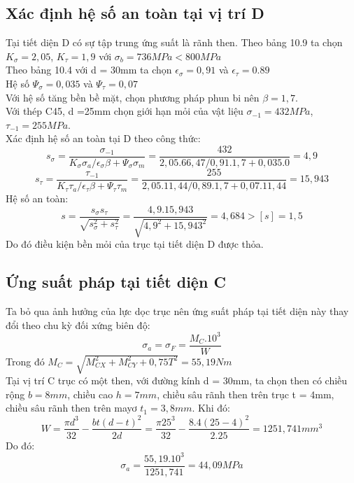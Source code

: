 \subsection{Xác định hệ số an toàn tại vị trí D}
Tại tiết diện D có sự tập trung ứng suất là rãnh then. Theo bảng 10.9 ta chọn $K_\sigma =2,05$, $K_\tau = 1,9$ với $\sigma_b = 736MPa < 800MPa$ \\
Theo bảng 10.4 với d = 30mm ta chọn $\epsilon_\sigma = 0,91$ và $\epsilon_\tau = 0.89$ \\
Hệ số $\Psi_\sigma = 0,035$ và $\Psi_\tau = 0,07$ \\ 
Với hệ số tăng bền bề mặt, chọn phương pháp phun bi nên $\beta = 1,7$. \\
Với thép C45, d =25mm chọn giới hạn mỏi của vật liệu $\sigma_{-1} = 432MPa$, $\tau_{-1} = 255MPa$. \\
Xác định hệ số an toàn tại D theo công thức:
\[
    s_\sigma = \frac{\sigma_{-1}}{K_\sigma \sigma_a / \epsilon_\sigma \beta + \Psi_\sigma \sigma_m} = \frac{432}{2,05.66,47/0,91.1,7 + 0,035.0} = 4,9
\]
\[
    s_\tau = \frac{\tau_{-1}}{K_\tau \tau_a / \epsilon_\tau \beta + \Psi_\tau \tau_m} = \frac{255}{2,05.11,44/0,89.1,7 + 0,07.11,44} = 15,943
\]
Hệ số an toàn:
\[
    s = \frac{s_\sigma s_\tau}{\sqrt{s_\sigma^2 + s_\tau^2}} = \frac{4,9.15,943}{\sqrt{4,9^2 + 15,943^2}} = 4,684 > [s] = 1,5
\]
Do đó điều kiện bền mỏi của trục tại tiết diện D được thỏa.
\subsection{Ứng suất pháp tại tiết diện C}
Ta bỏ qua ảnh hưởng của lực dọc trục nên ứng suất pháp tại tiết diện này thay đổi theo chu kỳ đối xứng biên độ:
\[
    \sigma_a = \sigma_F = \frac{M_C.10^3}{W}
\]
Trong đó $M_C = \sqrt{M_{CX}^2 + M_{CY}^2 + 0,75T^2} = 55,19 Nm$\\
Tại vị trí C trục có một then, với đường kính d = 30mm, ta chọn then có chiều rộng $b = 8mm$, chiều cao $h = 7mm$, chiều sâu rãnh then trên trục t = 4mm, chiều sâu rãnh then trên mayơ $t_1 = 3,8 mm$. Khi đó: 
\[
    W = \frac{\pi d^3}{32} - \frac{bt(d-t)^2}{2d} = \frac{\pi 25^3}{32} - \frac{8.4(25-4)^2}{2.25} = 1251,741mm^3
\]
Do đó:  
\[
    \sigma_a = \frac{55,19.10^3}{1251,741} = 44,09MPa
\]
